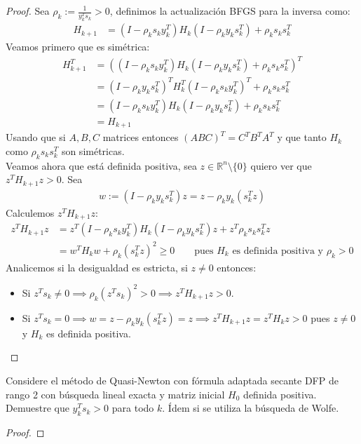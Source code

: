 \documentclass{article}
\newcommand{\R}{\mathbb{R}}
\newenvironment{theorem}[2][Ejercicio]{\begin{trivlist}
\item[\hskip \labelsep {\bfseries #1}\hskip \labelsep {\bfseries #2.}]}{\end{trivlist}}
\begin{document}
\begin{proof}
    Sea \( \rho_k := \frac{1}{y_k^T s_k} > 0 \), definimos la actualización BFGS para la inversa como: \begin{align*}
        H_{k+1} & = \left(I - \rho_k s_k y_k^T \right) H_k \left(I - \rho_k y_k s_k^T \right) + \rho_k s_k s_k^T
    \end{align*}
    Veamos primero que es simétrica: \begin{align*}
        H_{k+1}^T & = {\left( \left(I - \rho_k s_k y_k^T \right) H_k \left(I - \rho_k y_k s_k^T \right) + \rho_k s_k s_k^T \right)}^T \\
                  & = {\left(I - \rho_k y_k s_k^T \right)}^T H_k^T {\left(I - \rho_k s_k y_k^T \right)}^T + \rho_k s_k s_k^T          \\
                  & = \left(I - \rho_k s_k y_k^T \right) H_k \left(I - \rho_k y_k s_k^T \right) + \rho_k s_k s_k^T                    \\
                  & = H_{k+1}
    \end{align*}
    Usando que si \( A, B, C \) matrices entonces \( {(ABC)}^T = C^T B^T A^T \) y que tanto \( H_k \) como \( \rho_k s_k s_k^T \) son simétricas. \\
    Veamos ahora que está definida positiva, sea \( z \in \R^n \setminus \{ 0 \} \) quiero ver que \( z^T H_{k+1} z > 0 \). Sea \begin{align*}
        w := (I - \rho_k y_k s_k^T) z = z - \rho_k y_k (s_k^T z)
    \end{align*}
    Calculemos \( z^T H_{k+1} z \): \begin{align*}
        z^T H_{k+1} z & = z^T \left( I - \rho_k s_k y_k^T \right) H_k \left(I - \rho_k y_k s_k^T \right) z + z^T \rho_k s_k s_k^T z  \\
                      & = w^T H_k w + {\rho_k (s_k^T z)}^2 \geq 0 \qquad \text{pues } H_k \text{ es definida positiva y } \rho_k > 0
    \end{align*}
    Analicemos si la desigualdad es estricta, si \( z \neq 0 \) entonces: \begin{itemize}
        \item Si \( z^T s_k \neq 0 \implies \rho_k {(z^T s_k)}^2 > 0 \implies z^T H_{k+1} z > 0 \).
        \item Si \( z^T s_k = 0 \implies w = z - \rho_k y_k (s_k^T z) = z \implies z^T H_{k+1} z = z^T H_k z > 0 \) pues \( z \neq 0 \) y \( H_k \) es definida positiva.
    \end{itemize}
\end{proof}
\vspace{0.25in}

\begin{theorem}{9}
    Considere el método de Quasi-Newton con fórmula adaptada secante DFP de rango 2
    con búsqueda lineal exacta y matriz inicial \(H_0\) definida positiva.
    Demuestre que \(y_k^T s_k > 0\) para todo \(k\).
    Ídem si se utiliza la búsqueda de Wolfe.
\end{theorem}

\begin{proof}

\end{proof}
\vspace{0.25in}
\end{document}
